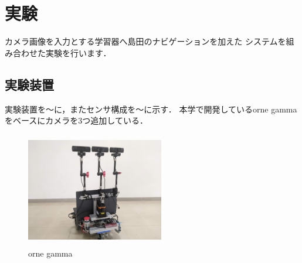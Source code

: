\documentclass{sice-si}
\begin{document}
\section{実験}
カメラ画像を入力とする学習器へ島田のナビゲーションを加えた
システムを組み合わせた実験を行います．
\subsection{実験装置}
実験装置を〜に，またセンサ構成を〜に示す．
本学で開発しているorne gammaをベースにカメラを3つ追加している．

\begin{figure}[htbp]
    \begin{center}
    \includegraphics[width=60mm,height=50mm]{./figs/gamma.jpg}
    \caption{orne gamma}
    \end{center}
\end{figure}
\end{document}
